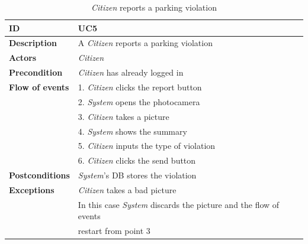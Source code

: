 \documentclass{article}
\begin{document}
\clearpage
\begin{table}
    \begin{center}
    \centering
\begin{tabular}{ | l | l |}
\hline
\textbf{ID} & UC5 \\
\hline
\textbf{Description} & A \textit{Citizen} reports a parking violation  \\
\hline
\textbf{Actors} & \textit{Citizen} \\
\hline
\textbf{Precondition} & \textit{Citizen} has already logged in \\
\hline
\textbf{Flow of events} & 1. \textit{Citizen} clicks the report button \\
                        & 2. \textit{System} opens the photocamera \\
                        & 3. \textit{Citizen} takes a picture  \\
                        & 4. \textit{System} shows the summary \\
                        & 5. \textit{Citizen} inputs the type of violation \\
                        & 6. \textit{Citizen} clicks the send button \\
\hline
\textbf{Postconditions} & \textit{System}'s DB stores the violation  \\
\hline
\textbf{Exceptions} & \textit{Citizen} takes a bad picture \\
                    & In this case \textit{System} discards the picture and the flow of events  \\
                    & restart from point 3\\  
\hline
\end{tabular}
\caption{\textit{Citizen} reports a parking violation}
\end{center}
\end{table}
\end{document}
